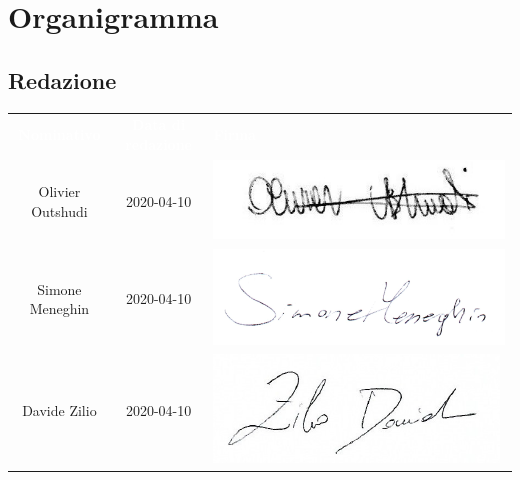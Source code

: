 \section{Organigramma}

\renewcommand{\arraystretch}{1.5}

\subsection{Redazione} 
\begin{table}[H]
	\begin{center}
	\begin{tabular}{ c c C{8cm} }
		\textcolor{white}{\textbf{Nominativo}} & \textcolor{white}{\textbf{Data di redazione}} & \textcolor{white}{\textbf{Firma}} \\
		Olivier Outshudi & 2020-04-10 & \includegraphics[scale=0.3]{img/firme/outshudi.png}\\
		Simone Meneghin & 2020-04-10 & \includegraphics[scale=0.10]{img/firme/meneghin.png}\\
		Davide Zilio & 2020-04-10 & \includegraphics[scale=0.4]{img/firme/zilio.png}\\
	\end{tabular}
	\end{center}	
\end{table}

